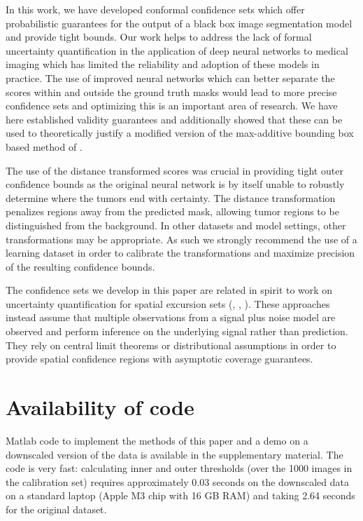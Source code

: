 In this work, we have developed conformal confidence sets which offer probabilistic guarantees for the output of a black box image segmentation model and provide tight bounds. Our work helps to address the lack of formal uncertainty quantification in the application of deep neural networks to medical imaging which has limited the reliability and adoption of these models in practice. The use of improved neural networks which can better separate the scores within and outside the ground truth masks would lead to more precise confidence sets and optimizing this is an important area of research. We have here established validity guarantees and additionally showed that these can be used to theoretically justify a modified version of the max-additive bounding box based method of \cite{Andeol2023}. 

The use of the distance transformed scores was crucial in providing tight outer confidence bounds as the original neural network is by itself unable to robustly determine where the tumors end with certainty.  The distance transformation penalizes regions away from the predicted mask, allowing tumor regions to be distinguished from the background. In other datasets and model settings, other transformations may be appropriate. As such we strongly recommend the use of a learning dataset in order to calibrate the transformations and maximize precision of the resulting confidence bounds.

The confidence sets we develop in this paper are related in spirit to work on uncertainty quantification for spatial excursion sets (\cite{Bowring2019}, \cite{Mejia2020}, \cite{chen2017density}). These approaches instead assume that multiple observations from a signal plus noise model are observed and perform inference on the underlying signal rather than prediction. They rely on central limit theorems or distributional assumptions in order to provide spatial confidence regions with asymptotic coverage guarantees. 

\section*{Availability of code}
\vspace{-0.1cm}
Matlab code to implement the methods of this paper and a demo on a downscaled version of the data is available in the supplementary material. The code is very fast: calculating inner and outer thresholds (over the 1000 images in the calibration set) requires approximately 0.03 seconds on the downscaled data on a standard laptop (Apple M3 chip with 16 GB RAM) and taking 2.64 seconds for the original dataset.